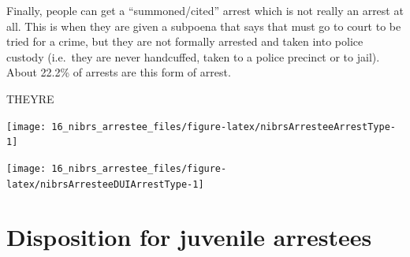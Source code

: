 \documentclass[
]{krantz}
\let\origfigure\figure
\let\endorigfigure\endfigure
\renewenvironment{figure}[1][2] {
    \expandafter\origfigure\expandafter[H]
} {
    \endorigfigure
}
\begin{document}
Finally, people can get a ``summoned/cited'' arrest which is
not really an arrest at all. This is when they are given a
subpoena that says that must go to court to be tried for a
crime, but they are not formally arrested and taken into
police custody (i.e.~they are never handcuffed, taken to a
police precinct or to jail). About 22.2\% of arrests are
this form of arrest.

THEYRE

\begin{figure}

{\centering \texttt{[image: 16\_nibrs\_arrestee\_files/figure-latex/nibrsArresteeArrestType-1]} 

}

\caption{Annual arrest type for all arrestees, 1991-2022. Previous Incident Report includes cases where an individual was arrested for a separate crime and are then reported as also arrested for this incident.}\label{fig:nibrsArresteeArrestType}
\end{figure}

\begin{figure}

{\centering \texttt{[image: 16\_nibrs\_arrestee\_files/figure-latex/nibrsArresteeDUIArrestType-1]} 

}

\caption{Annual arrest type for DUI arrestees, 1991-2022.}\label{fig:nibrsArresteeDUIArrestType}
\end{figure}

\section{Disposition for juvenile
arrestees}\label{disposition-for-juvenile-arrestees}
\end{document}
